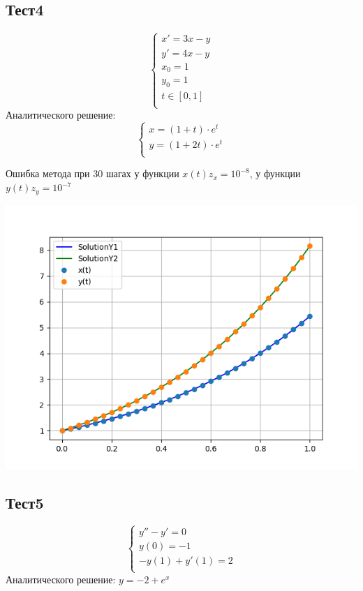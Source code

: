\documentclass[a4paper,12pt,titlepage,finall]{article}
\begin{document}
\subsection{Тест4}
\begin{equation*}
 \begin{cases}
   x' = 3x - y\\
   y' = 4x - y\\
   x_0 = 1\\
   y_0 = 1\\
   t \in [0, 1]\\
 \end{cases}
\end{equation*}
Аналитического решение:\newline
\begin{equation*}
 \begin{cases}
   x = (1 + t) \cdot e^{t}\\
   y = (1 + 2t) \cdot e^{t}\\
 \end{cases}
\end{equation*}

Ошибка метода при 30 шагах у функции $x(t) z_x = 10^{-8}$, у функции $y(t) z_y = 10^{-7}$

\includegraphics[width=450pt]{Graphics/1.1.png}\newline
\newpage
\subsection{Тест5}
\begin{equation*}
 \begin{cases}
   y'' - y' = 0\\
   y(0) = -1\\
   -y(1) + y'(1) = 2\\
 \end{cases}
\end{equation*}
Аналитического решение: $y = -2 + e^{x}$\\
\end{document}
